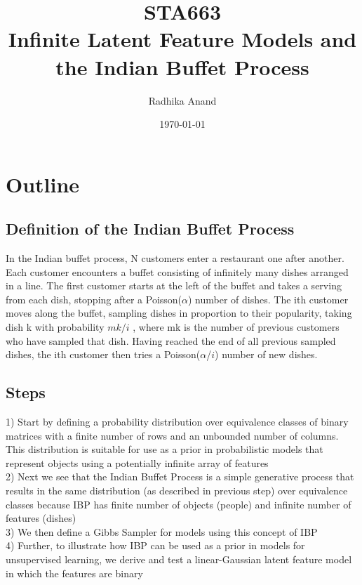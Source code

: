 \documentclass[11pt]{article}
\begin{document}
\author{Radhika Anand}
\title{STA663 \\Infinite Latent Feature Models and the Indian Buffet Process}
\date{\today}
\maketitle

\section{Outline}
\subsection{Definition of the Indian Buffet Process}

In the Indian buffet process, N customers enter a restaurant one after another. Each customer encounters a buffet consisting of infinitely many dishes arranged in a line. The first customer starts at the left of the buffet and takes a serving from each dish, stopping after a Poisson($\alpha$) number of dishes. The ith customer moves along the buffet, sampling dishes in proportion to their popularity, taking dish k with probability $mk/i$ , where mk is the number of previous customers who have sampled that dish. Having reached the end of all previous sampled dishes, the ith customer then tries a Poisson($\alpha$/$i$) number of new dishes.


\subsection{Steps}

1) Start by defining a probability distribution over equivalence classes of binary matrices with a finite number of rows and an unbounded number of columns. This distribution is suitable for use as a prior in probabilistic models that represent objects using a potentially infinite array of features\\

2) Next we see that the Indian Buffet Process is a simple generative process that results in the same distribution (as described in previous step) over equivalence classes because IBP has finite number of objects (people) and infinite number of features (dishes)\\

3) We then define a Gibbs Sampler for models using this concept of IBP\\

4) Further, to illustrate how IBP can be used as a prior in models for unsupervised learning, we derive and test a linear-Gaussian latent feature model in which the features are binary\\
\end{document}
